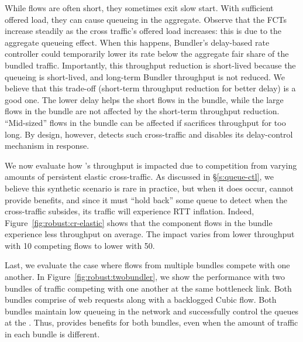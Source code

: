 While flows are often short, they sometimes exit slow start. With sufficient offered load, they can cause queueing in the aggregate. 
Observe that the \baseline FCTs increase steadily as the cross traffic's offered load increases: this is due to the aggregate queueing effect.
When this happens, Bundler's delay-based rate controller could temporarily lower its rate below the aggregate fair share of the bundled traffic.
Importantly, this throughput reduction is short-lived because the queueing is short-lived, and long-term Bundler throughput is not reduced.
We believe that this trade-off (short-term throughput reduction for better delay) is a good one. 
The lower delay helps the short flows in the bundle, while the large flows in the bundle are not affected by the short-term throughput reduction. 
``Mid-sized'' flows in the bundle can be affected if \name sacrifices throughput for too long. 
By design, however, \name detects such cross-traffic and disables its delay-control mechanism in response.


We now evaluate how \name's throughput is impacted due to competition from varying amounts of persistent elastic cross-traffic. 
As discussed in \S\ref{s:queue-ctl}, we believe this synthetic scenario is rare in practice, but when it does occur, \name cannot provide benefits, and since it must ``hold back'' some queue to detect when the cross-traffic subsides, its traffic will experience RTT inflation.
Indeed, Figure~\ref{fig:robust:cr-elastic} shows that 
the component flows in the bundle experience  \bundlerElasticTputWorseness less throughput on average. 
The impact varies from \bundlerElasticTputWorsenessTen lower throughput with 10 competing flows to \bundlerElasticTputWorsenessFifty lower with 50. 


 Last, we evaluate the case where flows from multiple bundles compete with one another. 
In Figure~\ref{fig:robust:twobundler}, we show the performance with two bundles of traffic competing with one another at the same bottleneck link. 
Both bundles comprise of web requests along with a backlogged Cubic flow. 
Both bundles maintain low queueing in the network and successfully control the queues at the \inbox.
Thus, \name provides benefits for both bundles, even when the amount of traffic in each bundle is different.  

